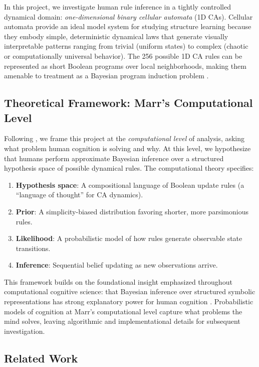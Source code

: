 \documentclass[10pt,letterpaper]{article}
\begin{document}
In this project, we investigate human rule inference in a tightly controlled dynamical domain: \textit{one-dimensional binary cellular automata} (1D CAs). Cellular automata provide an ideal model system for studying structure learning because they embody simple, deterministic dynamical laws that generate visually interpretable patterns ranging from trivial (uniform states) to complex (chaotic or computationally universal behavior). The 256 possible 1D CA rules can be represented as short Boolean programs over local neighborhoods, making them amenable to treatment as a Bayesian program induction problem \cite{wolfram1983statistical}.

\subsection{Theoretical Framework: Marr's Computational Level}

Following , we frame this project at the \textit{computational level} of analysis, asking what problem human cognition is solving and why. At this level, we hypothesize that humans perform approximate Bayesian inference over a structured hypothesis space of possible dynamical rules. The computational theory specifies:
\begin{enumerate}
    \item \textbf{Hypothesis space}: A compositional language of Boolean update rules (a ``language of thought'' for CA dynamics).
    \item \textbf{Prior}: A simplicity-biased distribution favoring shorter, more parsimonious rules.
    \item \textbf{Likelihood}: A probabilistic model of how rules generate observable state transitions.
    \item \textbf{Inference}: Sequential belief updating as new observations arrive.
\end{enumerate}

This framework builds on the foundational insight emphasized throughout computational cognitive science: that Bayesian inference over structured symbolic representations has strong explanatory power for human cognition \cite{griffiths2024bayesian}. Probabilistic models of cognition at Marr's computational level capture what problems the mind solves, leaving algorithmic and implementational details for subsequent investigation.

\subsection{Related Work}
\end{document}
